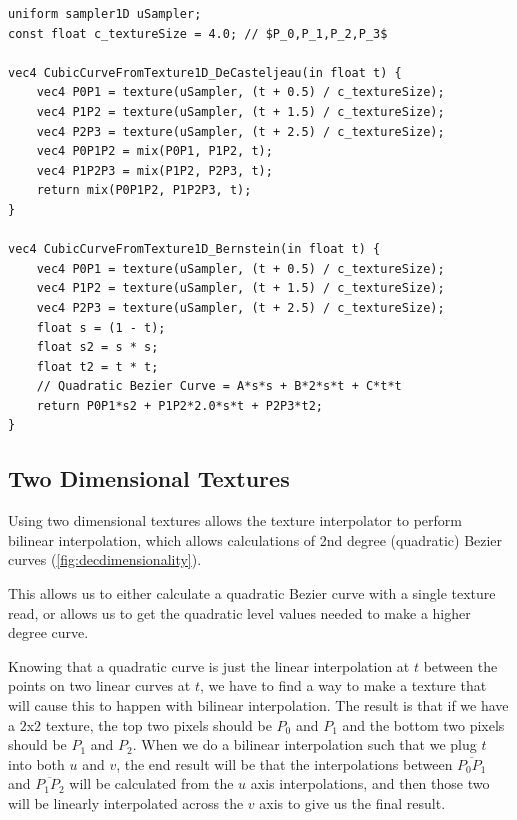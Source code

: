 \documentclass{jcgt}
\begin{document}
\begin{lstlisting}[caption={GLSL for evaluating a cubic curve encoded in a 4 pixel 1d texture.  Linear texture sampling is used to evaluate the linear level of the De Casteljeau algorithm, then the process is continued both with the De Casteljeau algorithm, as well as the Bernstein form of a quadratic Bezier curve.}, label={lst:GLSLCubicTexture1D}]
uniform sampler1D uSampler;  
const float c_textureSize = 4.0; // $P_0,P_1,P_2,P_3$

vec4 CubicCurveFromTexture1D_DeCasteljeau(in float t) {
    vec4 P0P1 = texture(uSampler, (t + 0.5) / c_textureSize);
    vec4 P1P2 = texture(uSampler, (t + 1.5) / c_textureSize);
    vec4 P2P3 = texture(uSampler, (t + 2.5) / c_textureSize);
    vec4 P0P1P2 = mix(P0P1, P1P2, t);
    vec4 P1P2P3 = mix(P1P2, P2P3, t);
    return mix(P0P1P2, P1P2P3, t);
}

vec4 CubicCurveFromTexture1D_Bernstein(in float t) {
    vec4 P0P1 = texture(uSampler, (t + 0.5) / c_textureSize);
    vec4 P1P2 = texture(uSampler, (t + 1.5) / c_textureSize);
    vec4 P2P3 = texture(uSampler, (t + 2.5) / c_textureSize);
    float s = (1 - t);
    float s2 = s * s;
    float t2 = t * t;
    // Quadratic Bezier Curve = A*s*s + B*2*s*t + C*t*t
    return P0P1*s2 + P1P2*2.0*s*t + P2P3*t2;
}
\end{lstlisting}

\subsection{Two Dimensional Textures}
Using two dimensional textures allows the texture interpolator to perform bilinear interpolation, which allows calculations of 2nd degree (quadratic) Bezier curves (\autoref{fig:decdimensionality}).

This allows us to either calculate a quadratic Bezier curve with a single texture read, or allows us to get the quadratic level values needed to make a higher degree curve.

Knowing that a quadratic curve is just the linear interpolation at $t$ between the points on two linear curves at $t$, we have to find a way to make a texture that will cause this to happen with bilinear interpolation.  The result is that if we have a $2$x$2$ texture, the top two pixels should be $P_0$ and $P_1$ and the bottom two pixels should be $P_1$ and $P_2$.  When we do a bilinear interpolation such that we plug $t$ into both $u$ and $v$, the end result will be that the interpolations between $\overline{P_0P_1}$ and $\overline{P_1P_2}$ will be calculated from the $u$ axis interpolations, and then those two will be linearly interpolated across the $v$ axis to give us the final result.
\end{document}
